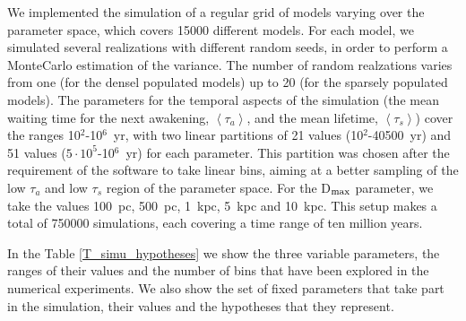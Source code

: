 \documentclass[crop]{CSLB}
\newcommand{\ttn}[1]{}
\begin{document}
We implemented the simulation of a regular grid of models varying over
the parameter space, which covers 15000 different models.
%
For each model, we simulated several realizations with different random
seeds, in order to perform a MonteCarlo estimation of the variance.
%
The number of random realzations varies from one (for the densel populated models)
up to 20 (for the sparsely populated models).
%
The parameters for the temporal aspects of the simulation (the mean
waiting time for the next awakening, $\left<\tau_a\right>$, and the
mean lifetime, $\left<\tau_s\right>$) cover the ranges
10$^2$-10$^6$~yr, with 
two linear partitions of 21 values (10$^2$-40500~yr) and 51 values
($5\cdot10^5$-10$^6$~yr)
for each parameter.
%
This partition was chosen after the requirement of the software to take linear bins, 
aiming at a better sampling of the low $\tau_a$ and low $\tau_s$ region of the parameter space.
%
For the D$_{\rm max}$ parameter, we take the 
values 100~pc, 500~pc, 1~kpc, 5~kpc and 10~kpc.
%
This setup makes a total of 750000 simulations, each covering a time
range of ten million years.
%
\ttn{1}
%
In the Table \ref{T_simu_hypotheses} we show the three variable
parameters, the ranges of their values and the number of bins that
have been explored in the numerical experiments.
%
We also show the set of fixed parameters that take part in the simulation,
their values and the hypotheses that they represent.
\end{document}
